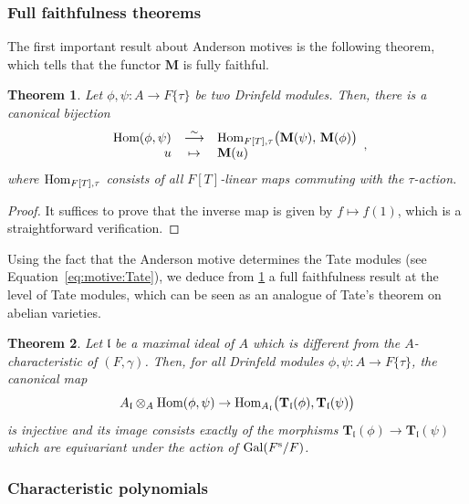 \documentclass[11pt]{article}
\newtheorem{theorem}{Theorem}[section]
\theoremstyle{definition}
\newcommand{\Hom}{\text{\rm Hom}}
\newcommand{\MM}{\mathbf{M}}
\newcommand{\TT}{\mathbf{T}}
\newcommand{\Fs}{F^{\text{\rm s}}}
\newcommand{\Gal}{\text{\rm Gal}}
\begin{document}
\subsubsection{Full faithfulness theorems}

The first important result about Anderson motives is the following
theorem, which tells that the functor $\MM$ is fully faithful. 

\begin{theorem}
\label{th:motive:fullyfaithful}
Let $\phi, \psi : A \to F\{\tau\}$ be two Drinfeld modules.
Then, there is a canonical bijection
$$\begin{array}{rcl}
\Hom(\phi,\psi) & \stackrel\sim\longrightarrow &
  \Hom_{F[T], \tau}\big(\MM(\psi),\,\MM(\phi)\big) \\
u & \mapsto & \MM(u)
\end{array},$$
where $\Hom_{F[T], \tau}$ consists of all
$F[T]$-linear maps commuting with the $\tau$-action.
\end{theorem}

\begin{proof}
It suffices to prove that the inverse map is given by $f \mapsto
f(1)$, which is a straightforward verification.
\end{proof}

Using the fact that the Anderson motive determines the Tate
modules (see Equation~\eqref{eq:motive:Tate}), we deduce from \cref{th:motive:fullyfaithful} a full faithfulness result at the level of Tate modules, which can be seen as an analogue of Tate's theorem on abelian varieties.

\begin{theorem}
\label{theorem:fidelite-tate}
  Let $\mathfrak l$ be a maximal ideal of $A$ which is different
  from the $A$-characteristic of $(F, \gamma)$.
  Then, for all Drinfeld modules $\phi, \psi : A \to F\{\tau\}$,
  the canonical map
  \[
    A_{\mathfrak l} \otimes_A \Hom(\phi, \psi) \to 
      \Hom_{A_{\mathfrak l}}\big(\TT_{\mathfrak l}(\phi), \TT_{\mathfrak l}(\psi)\big)
  \]
  is injective and its image consists exactly of the morphisms
  $\TT_{\mathfrak l}(\phi) \to \TT_{\mathfrak l}(\psi)$ which are
  equivariant under the action of $\Gal(\Fs/F)$.
\end{theorem}

\subsubsection{Characteristic polynomials}
\label{subsubsec:charpoly}
\end{document}
